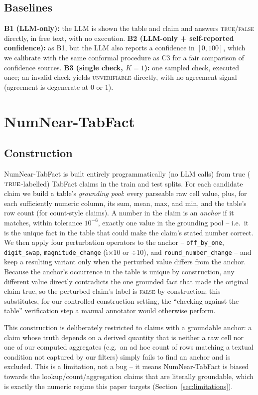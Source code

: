 \documentclass[journal]{IEEEtran}
\begin{document}
\subsection{Baselines}
\label{sec:baselines}
\textbf{B1 (LLM-only):} the LLM is shown the table and claim and answers
\textsc{true}/\textsc{false} directly, in free text, with no execution.
\textbf{B2 (LLM-only + self-reported confidence):} as B1, but the LLM also
reports a confidence in $[0,100]$, which we calibrate with the same
conformal procedure as C3 for a fair comparison of confidence sources.
\textbf{B3 (single check, $K=1$):} one sampled check, executed once; an
invalid check yields \textsc{unverifiable} directly, with no agreement
signal (agreement is degenerate at $0$ or $1$).

\section{NumNear-TabFact}
\label{sec:nearmiss}

\subsection{Construction}
NumNear-TabFact is built entirely programmatically (no LLM calls) from true
($\textsc{true}$-labelled) TabFact claims in the train and test splits. For
each candidate claim we build a table's \emph{grounding pool}: every
parseable raw cell value, plus, for each sufficiently numeric column, its
sum, mean, max, and min, and the table's row count (for count-style claims).
A number in the claim is an \emph{anchor} if it matches, within tolerance
$10^{-6}$, exactly one value in the grounding pool -- i.e.\ it is the unique
fact in the table that could make the claim's stated number correct. We then
apply four perturbation operators to the anchor -- \texttt{off\_by\_one},
\texttt{digit\_swap}, \texttt{magnitude\_change} (\'{\i}$\times 10$ or
$\div 10$), and \texttt{round\_number\_change} -- and keep a resulting
variant only when the perturbed value differs from the anchor. Because the
anchor's occurrence in the table is unique by construction, any different
value directly contradicts the one grounded fact that made the original
claim true, so the perturbed claim's label is \textsc{false} by
construction; this substitutes, for our controlled construction setting,
the ``checking against the table'' verification step a manual annotator
would otherwise perform.

This construction is deliberately restricted to claims with a groundable
anchor: a claim whose truth depends on a derived quantity that is neither a
raw cell nor one of our computed aggregates (e.g.\ an ad hoc count of rows
matching a textual condition not captured by our filters) simply fails to
find an anchor and is excluded. This is a limitation, not a bug -- it means
NumNear-TabFact is biased towards the lookup/count/aggregation claims that
are literally groundable, which is exactly the numeric regime this paper
targets (Section~\ref{sec:limitations}).
\end{document}
